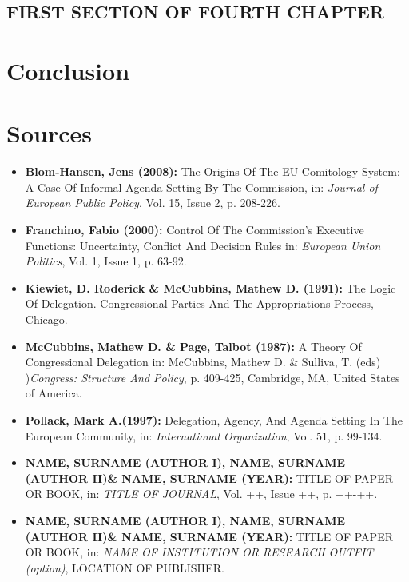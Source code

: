 \documentclass[11pt,a4paper,english]{scrreprt}
\begin{document}
  \section{FIRST SECTION OF FOURTH CHAPTER}


  
  
\chapter{Conclusion}







\chapter{Sources}

  \begin{itemize}
	
	\sffamily
	
	\item [\Rectsteel] \textbf{Blom-Hansen, Jens (2008):} The Origins Of
The EU Comitology System: A Case Of Informal Agenda-Setting By The Commission,
in: \textsl{Journal of European Public Policy}, Vol. 15, Issue 2, p. 208-226.
	
	
	\item [\Rectsteel] \textbf{Franchino, Fabio (2000):} Control Of The
Commission's Executive Functions: Uncertainty, Conflict And Decision Rules
in: \textsl{European Union Politics}, Vol. 1, Issue 1, p. 63-92.


	\item [\Rectsteel] \textbf{Kiewiet, D. Roderick \& McCubbins, Mathew D.
(1991):} The Logic Of Delegation. Congressional Parties And The Appropriations
Process, Chicago.


	\item [\Rectsteel] \textbf{McCubbins, Mathew D. \& Page, Talbot
(1987):} A Theory Of Congressional Delegation in: McCubbins, Mathew
D. \& Sulliva, T. (eds) )\textsl{Congress: Structure And Policy}, p. 409-425,
Cambridge, MA, United States of America.
	
	
	\item [\Rectsteel] \textbf{Pollack, Mark A.(1997):} Delegation, Agency,
And Agenda Setting In The European Community, in: \textsl{International
Organization}, Vol. 51, p. 99-134.	

	
	
	\item [\Rectsteel] \textbf{NAME, SURNAME (AUTHOR I), NAME, SURNAME
(AUTHOR II)\& NAME, SURNAME (YEAR):} TITLE OF PAPER OR BOOK,
in: \textsl{TITLE OF JOURNAL}, Vol. ++, Issue ++, p. ++-++.


	\item [\Rectsteel] \textbf{NAME, SURNAME (AUTHOR I), NAME, SURNAME
(AUTHOR II)\& NAME, SURNAME (YEAR):} TITLE OF PAPER OR BOOK,
in: \textsl{NAME OF INSTITUTION OR RESEARCH OUTFIT (option)}, LOCATION OF
PUBLISHER.


  \end{itemize}
\end{document}
